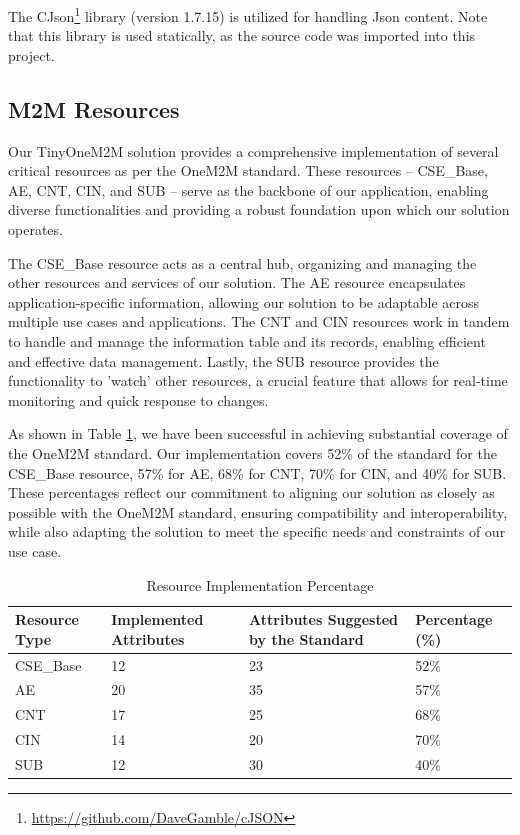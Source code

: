 \documentclass[a4paper,fleqn]{cas-dc}
\begin{document}
The CJson\footnote{\url{https://github.com/DaveGamble/cJSON}} library (version 1.7.15) is utilized for handling Json content. Note that this library is used statically, as the source code was imported into this project.

\subsection{M2M Resources}\label{sec:m2mresources}

Our TinyOneM2M solution provides a comprehensive implementation of several critical resources as per the OneM2M standard. These resources -- CSE\_Base, AE, CNT, CIN, and SUB -- serve as the backbone of our application, enabling diverse functionalities and providing a robust foundation upon which our solution operates.

The CSE\_Base resource acts as a central hub, organizing and managing the other resources and services of our solution. The AE resource encapsulates application-specific information, allowing our solution to be adaptable across multiple use cases and applications. The CNT and CIN resources work in tandem to handle and manage the information table and its records, enabling efficient and effective data management. Lastly, the SUB resource provides the functionality to 'watch' other resources, a crucial feature that allows for real-time monitoring and quick response to changes.

As shown in Table \ref{tab:resourceimplementationpercentage}, we have been successful in achieving substantial coverage of the OneM2M standard. Our implementation covers 52\% of the standard for the CSE\_Base resource, 57\% for AE, 68\% for CNT, 70\% for CIN, and 40\% for SUB. These percentages reflect our commitment to aligning our solution as closely as possible with the OneM2M standard, ensuring compatibility and interoperability, while also adapting the solution to meet the specific needs and constraints of our use case.

\begin{table}[h]
\scriptsize
\centering
\caption{Resource Implementation Percentage}
\label{tab:resourceimplementationpercentage}
\begin{tabular}{p{1.5cm}p{1.5cm}p{1.5cm}p{1.5cm}}
\hline
\textbf{Resource Type} & \textbf{Implemented Attributes} & \textbf{Attributes Suggested by the Standard} & \textbf{Percentage (\%)} \\
\hline \hline
CSE\_Base & 12 & 23 & 52\% \\
AE & 20 & 35 & 57\% \\
CNT & 17 & 25 & 68\% \\
CIN & 14 & 20 & 70\% \\
SUB & 12 & 30 & 40\% \\
\hline
\end{tabular}
\end{table}
\end{document}
